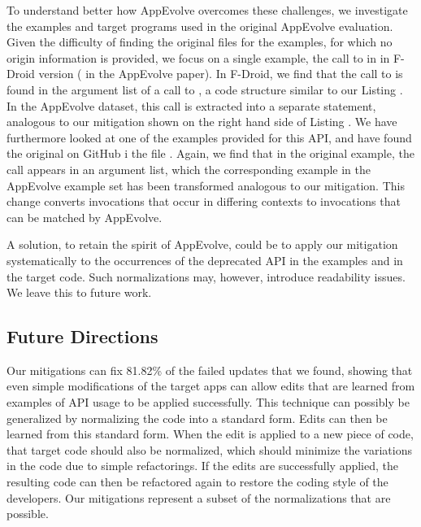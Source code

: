 To understand better how AppEvolve overcomes these challenges, we
investigate the examples and target programs used in the original AppEvolve
evaluation.  Given the difficulty of finding the original files for the
examples, for which no origin information is provided, we focus on a single
example, the call to  in  in F-Droid
version  ( in the AppEvolve paper).  In F-Droid, we
find that the call to  is found in the argument list
of a call to , a code structure similar to our Listing
.  In the AppEvolve dataset, this call is extracted into a
separate statement, analogous to our mitigation shown on the right hand
side of Listing .  We have furthermore looked at one of the
examples provided for this API, and have found the original on GitHub i the
file .  Again, we find that in the original example, the call
appears in an argument list, which the corresponding example in the
AppEvolve example set has been transformed analogous to our mitigation.
This change converts invocations that occur in differing contexts to
invocations that can be matched by AppEvolve.

A solution, to retain the spirit of AppEvolve, could be to apply our
mitigation systematically to the occurrences of the deprecated API in the
examples and in the target code.  Such normalizations may, however,
introduce readability issues.  We leave this to future work.


\subsection{Future Directions}

Our mitigations can fix 81.82\% of the failed updates that we found,
showing that even simple modifications of the target apps can allow
edits that are learned from examples of API usage to be applied
successfully. This technique can possibly be generalized by normalizing the
code into a standard form. Edits can then be learned from this standard
form. When the edit is applied to a new piece of code, that target code
should also be normalized, which should minimize the variations in the code
due to simple refactorings. If the edits are successfully applied, the
resulting code can then be refactored again to restore the coding
style of the developers.  Our mitigations represent a subset of the normalizations that are
possible.

